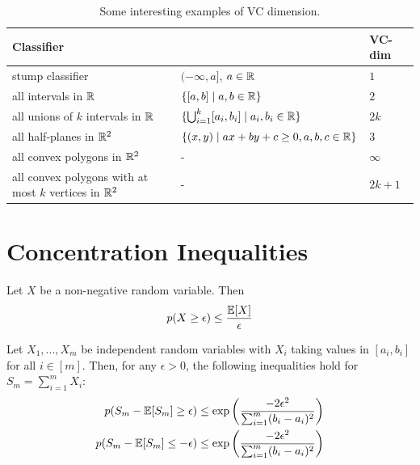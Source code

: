 \begin{table}[h]
{
\caption{Some interesting examples of VC dimension.}
\begin{tabular}{p{5.8cm} p{6.5cm} p{1.4cm}}
\toprule
	\textbf{Classifier} &  & \textbf{VC-dim} \\
	\midrule
stump classifier & $(-\infty, a]$, $a \in \mathbb{R}$  & $1$   \\
all intervals in $\mathbb{R}$ & $\{[a, b] \mid a, b \in \mathbb{R} \}$  & $2$   \\
all unions of $k$ intervals in $\mathbb{R}$  & $\{\bigcup_{i=1}^k [a_i, b_i] \mid a_i, b_i \in \mathbb{R} \}$ & $2k$  \\
all half-planes in $\mathbb{R}^2$ & $\{(x, y) \mid ax + by + c \geq 0, a, b, c \in \mathbb{R} \}$ & $3$  \\
all convex polygons in $\mathbb{R}^2$ & - & $\infty$ \\
all convex polygons with at most $k$ vertices in $\mathbb{R}^2$ & - & $2k + 1$ \\
\bottomrule
\end{tabular}
}
\end{table}


\section{Concentration Inequalities}
\begin{theorem} Let $X$ be a non-negative random variable. Then
\begin{equation}
	p(X \geq \epsilon) \leq \frac{\mathbb{E}[X]}{\epsilon}
\end{equation}
\end{theorem}
\begin{theorem}
Let $X_1 , . . . , X_m$ be independent random variables with $X_i$ taking values in $[a_i, b_i]$ for all $i \in [m]$. Then, for any $\epsilon > 0$, the following inequalities hold for $S_m = \sum_{i=1}^m X_i$:
\begin{align}
	p(S_m - \mathbb{E}[S_m] \geq \epsilon) \leq \exp\left( \frac{-2\epsilon^2}{\sum_{i=1}^m (b_i - a_i)^2} \right) \\
	p(S_m - \mathbb{E}[S_m] \leq -\epsilon) \leq \exp\left( \frac{-2\epsilon^2}{\sum_{i=1}^m (b_i - a_i)^2} \right) 
\end{align}
\end{theorem}

